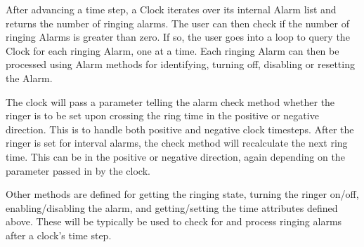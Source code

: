

After advancing a time step, a Clock iterates over its internal
Alarm list and returns the number of ringing alarms.  The user can then check
if the number of ringing Alarms is greater than zero.  If so, the user
goes into a loop to query the Clock for each ringing Alarm, one at a time.
Each ringing Alarm can then be processed using Alarm methods for identifying,
turning off, disabling or resetting the Alarm.

The clock will pass a parameter telling the alarm check method whether 
the ringer is
to be set upon crossing the ring time in the positive or negative direction.
This is to handle both positive and negative clock timesteps.  After the
ringer is set for interval alarms, the check method will recalculate the
next ring time.  This can be in the positive or negative direction, again
depending on the parameter passed in by the clock.

Other methods are defined for getting the ringing state, turning the
ringer on/off, enabling/disabling the alarm, and getting/setting the
time attributes defined above.  These will be typically be used to check for
and process ringing alarms after a clock's time step.
